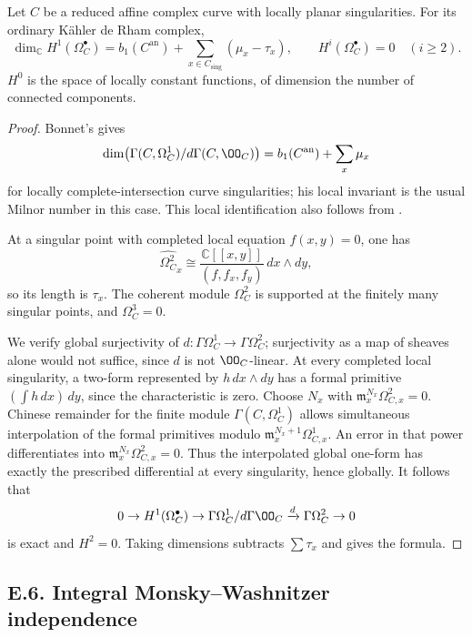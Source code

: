 \begin{theorem}\label{thm:DE-curves}
Let $C$ be a reduced affine complex curve with locally planar singularities.  For its ordinary K\"ahler de Rham complex,
\[
 \dim_{\mathbb C}H^1(\Omega_C^\bullet)
       =b_1(C^{\mathrm{an}})+\sum_{x\in C_{\mathrm{sing}}}(\mu_x-\tau_x),
 \qquad H^i(\Omega_C^\bullet)=0\quad(i\geq2).
\]
$H^0$ is the space of locally constant functions, of dimension the number of connected components.
\end{theorem}
\begin{proof}
Bonnet's \cite[Theorem~1.2]{Bonnet2006} gives
\[
 \dim\bigl(\Gamma(C,\Omega_C^1)/d\Gamma(C,\OO_C)\bigr)
       =b_1(C^{\mathrm{an}})+\sum_x\mu_x
\]
for locally complete-intersection curve singularities; his local invariant is the usual Milnor number in this case.  This local identification also follows from \cite[Theorem~2.2(1)]{DimcaGreuel2018}.

At a singular point with completed local equation $f(x,y)=0$, one has
\[
 \widehat{\Omega_C^2}_x\cong
 \frac{\mathbb C[[x,y]]}{(f,f_x,f_y)}\,dx\wedge dy,
\]
so its length is $\tau_x$.  The coherent module $\Omega_C^2$ is supported at the finitely many singular points, and $\Omega_C^3=0$.

We verify global surjectivity of $d:\Gamma\Omega_C^1\to\Gamma\Omega_C^2$; surjectivity as a map of sheaves alone would not suffice, since $d$ is not $\OO_C$-linear.  At every completed local singularity, a two-form represented by $h\,dx\wedge dy$ has a formal primitive $(\int h\,dx)\,dy$, since the characteristic is zero.  Choose $N_x$ with $\mathfrak m_x^{N_x}\Omega_{C,x}^2=0$.  Chinese remainder for the finite module $\Gamma(C,\Omega_C^1)$ allows simultaneous interpolation of the formal primitives modulo $\mathfrak m_x^{N_x+1}\Omega_{C,x}^1$.  An error in that power differentiates into $\mathfrak m_x^{N_x}\Omega_{C,x}^2=0$.  Thus the interpolated global one-form has exactly the prescribed differential at every singularity, hence globally.  It follows that
\[
 0\to H^1(\Omega_C^\bullet)\to
 \Gamma\Omega_C^1/d\Gamma\OO_C\xrightarrow{d}\Gamma\Omega_C^2\to0
\]
is exact and $H^2=0$.  Taking dimensions subtracts $\sum\tau_x$ and gives the formula.
\end{proof}

\subsection{E.6. Integral Monsky--Washnitzer independence}

